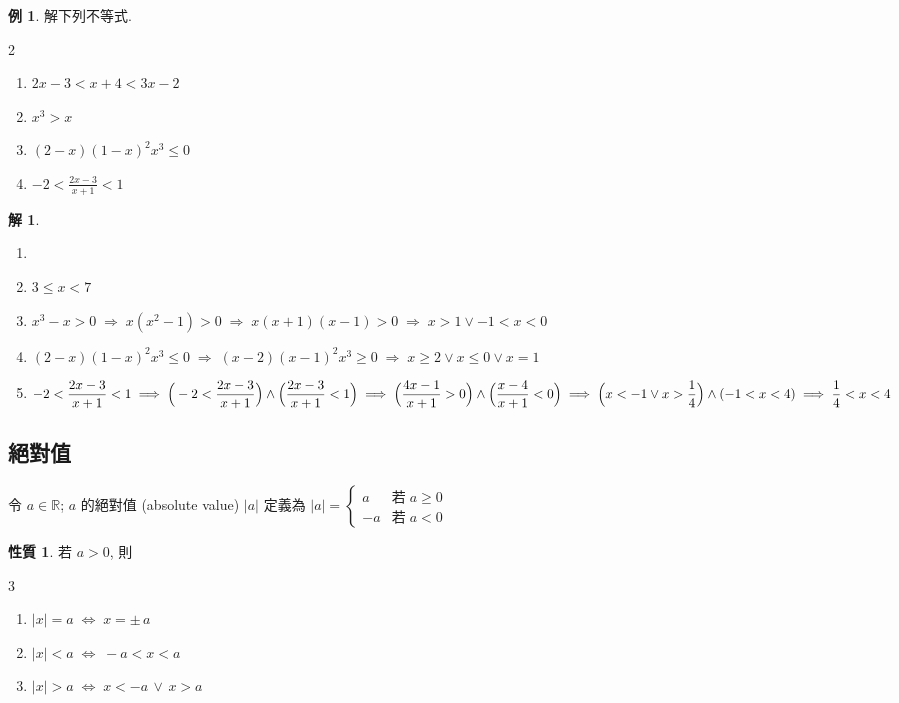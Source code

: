 \documentclass[12pt]{extarticle}
\newcommand{\ds}{\displaystyle}
\newcommand{\ie}{\;\Longrightarrow\;}
\newcommand{\ifff}{\;\Longleftrightarrow\;}
\theoremstyle{definition}
\newtheorem*{prp}{性質}
\newtheorem*{ex}{例}
\newtheorem*{sol}{解}
\begin{document}
\begin{ex}
  解下列不等式. 
  \setlength{\columnsep}{-20mm}
  \begin{multicols}{2}
    \begin{enumerate}\setlength\itemsep{0em}
      \item $\ds 2x - 3 < x + 4 < 3 x - 2$
      \item $\ds x^3 > x$
      \item $\ds (2 - x)(1 - x)^2 x^3 \leqslant 0$
      \item $\ds -2 < \frac{2x - 3}{x + 1} < 1$
    \end{enumerate}
  \end{multicols}
\end{ex}

\begin{sol}
  \begin{enumerate}\setlength\itemsep{0em}
    \item[]
    \item $\ds 3 \leqslant x < 7$
    \item $\ds x^3 - x > 0 \ie x(x^2 - 1) > 0 \ie x(x + 1)(x - 1) > 0 \ie x > 1 \vee -1 < x < 0$
    \item $\ds (2 - x)(1 - x)^2 x^3 \leqslant 0 \ie (x - 2)(x - 1)^2 x^3 \geqslant 0 \ie x\geqslant 2 \vee x\leqslant 0\vee x = 1$
    \item $\ds -2 < \frac{2x - 3}{x + 1} < 1 \ie \Big(-2 < \frac{2x - 3}{x + 1}\Big)\wedge\Big(\frac {2x - 3}{x + 1} < 1\Big) \ie \Big(\frac{4x - 1}{x + 1} > 0\Big) \wedge \Big(\frac{x - 4}{x + 1} < 0\Big) \\ \ie \Big(x < -1 \vee x > \frac{1}{4}\Big) \wedge (-1 < x < 4) \ie \frac{1}{4} < x < 4$
  \end{enumerate}
\end{sol}

\subsection*{絕對值}
令 $a\in\mathbb{R}$;  $a$ 的絕對值 (absolute value) $|a|$ 定義為 $\ds|a|=\begin{cases} a & \text{若}\;a\geqslant 0 \\ - a&\text{若}\;a < 0\end{cases}$

\begin{prp}
  若 $a > 0$, 則
  \setlength{\columnsep}{-20mm}
  \begin{multicols}{3}
    \begin{enumerate}\setlength\itemsep{0em}
      \item $\ds |x| = a \ifff x = \pm\,a$
      \item $\ds |x| < a \ifff -a < x < a$
      \item $\ds |x| > a \ifff x < -a \,\vee\, x > a$
    \end{enumerate}
  \end{multicols}
\end{prp}
\end{document}

